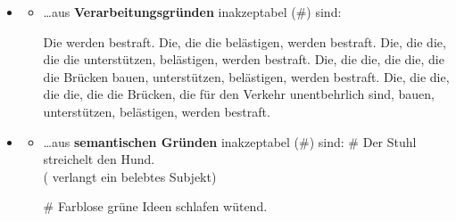 \begin{frame}

\begin{itemize}
	\item[]
	
	\begin{itemize}
	\item \dots aus \textbf{Verarbeitungsgründen} inakzeptabel (\#) sind:
		
\pause
		\ex Die werden bestraft.
		\ex Die, die die belästigen, werden bestraft.
		\ex Die, die die, die die unterstützen, belästigen, werden bestraft.
		\ex Die, die die, die die, die die Brücken bauen, unterstützen, belästigen, werden bestraft.
		\ex Die, die die, die die, die die Brücken, die für den Verkehr unentbehrlich sind, bauen, unterstützen, belästigen, werden bestraft.
		\z
\end{itemize}

\end{itemize}
\nocite{Coseriu88a, Fries15a, Repp&Co15a}
\end{frame}


\begin{frame}

\begin{itemize}
	\item[]
	
	\begin{itemize}
		
		\item \dots aus \textbf{semantischen Gründen} inakzeptabel (\#) sind:
		\ea \# Der Stuhl streichelt den Hund.\\
		( verlangt ein belebtes Subjekt)
		\z
		
		\ea \# Farblose grüne Ideen schlafen wütend. \citep{Chomsky57a}
		\z
		
	\end{itemize}

\end{itemize}
\nocite{Coseriu88a, Fries15a, Repp&Co15a}
\end{frame}


